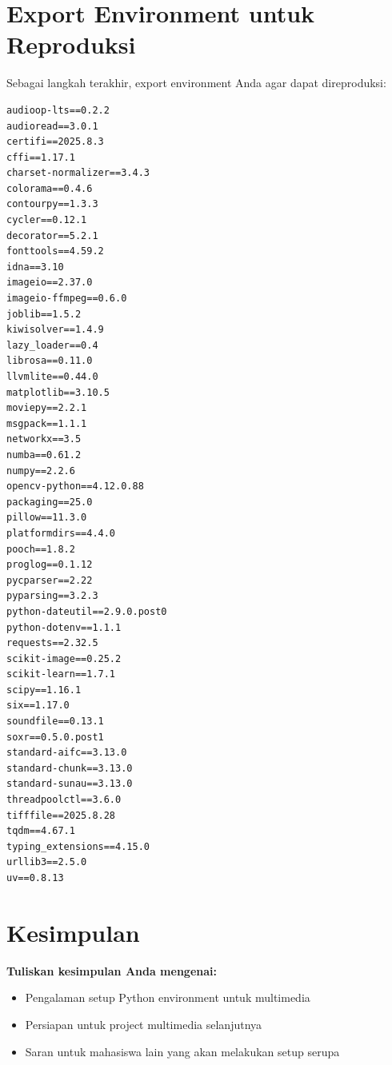 \documentclass[11pt,a4paper]{article}
\begin{document}
\section{Export Environment untuk Reproduksi}
Sebagai langkah terakhir, export environment Anda agar dapat direproduksi:




\begin{lstlisting}[caption=Environment/Requirements file]
audioop-lts==0.2.2
audioread==3.0.1
certifi==2025.8.3
cffi==1.17.1
charset-normalizer==3.4.3
colorama==0.4.6
contourpy==1.3.3
cycler==0.12.1
decorator==5.2.1
fonttools==4.59.2
idna==3.10
imageio==2.37.0
imageio-ffmpeg==0.6.0
joblib==1.5.2
kiwisolver==1.4.9
lazy_loader==0.4
librosa==0.11.0
llvmlite==0.44.0
matplotlib==3.10.5
moviepy==2.2.1
msgpack==1.1.1
networkx==3.5
numba==0.61.2
numpy==2.2.6
opencv-python==4.12.0.88
packaging==25.0
pillow==11.3.0
platformdirs==4.4.0
pooch==1.8.2
proglog==0.1.12
pycparser==2.22
pyparsing==3.2.3
python-dateutil==2.9.0.post0
python-dotenv==1.1.1
requests==2.32.5
scikit-image==0.25.2
scikit-learn==1.7.1
scipy==1.16.1
six==1.17.0
soundfile==0.13.1
soxr==0.5.0.post1
standard-aifc==3.13.0
standard-chunk==3.13.0
standard-sunau==3.13.0
threadpoolctl==3.6.0
tifffile==2025.8.28
tqdm==4.67.1
typing_extensions==4.15.0
urllib3==2.5.0
uv==0.8.13
\end{lstlisting}

\section{Kesimpulan}
\textbf{Tuliskan kesimpulan Anda mengenai:}
\begin{itemize}
    \item Pengalaman setup Python environment untuk multimedia
    \item Persiapan untuk project multimedia selanjutnya
    \item Saran untuk mahasiswa lain yang akan melakukan setup serupa
\end{itemize}
\end{document}
